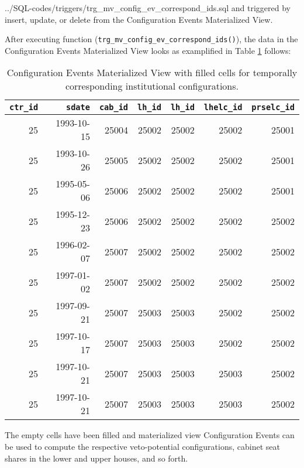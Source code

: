 %
{../SQL-codes/triggers/trg_mv_config_ev_correspond_ids.sql}
and triggered by insert, update, or delete from the Configuration Events Materialized View.%

After executing function (\texttt{trg\_mv\_config\_ev\_correspond\_ids()}), the data in the Configuration Events Materialized View looks as examplified in Table \ref{tab_mview_config_events_filled_cells} follows:

\begin{table}[h!]
\centering\footnotesize
\caption{Configuration Events Materialized View with filled cells for temporally corresponding institutional configurations.}
\label{tab_mview_config_events_filled_cells}
\begin{tabular}{r r r r r r r}
\tabularnewline\toprule\toprule
\multicolumn{1}{r}{\texttt{ctr\_id}}	&
\multicolumn{1}{r}{\texttt{sdate}}	&	
\multicolumn{1}{r}{\texttt{cab\_id}}	&
\multicolumn{1}{r}{\texttt{lh\_id}}	&
\multicolumn{1}{r}{\texttt{lh\_id}}	&	
\multicolumn{1}{r}{\texttt{lhelc\_id}}	&	
\multicolumn{1}{r}{\texttt{prselc\_id}}	\\\midrule
25	&	1993-10-15	&	25004	&	25002	&	25002	&	25002	&	25001	\\
25	&	1993-10-26	&	25005	&	25002	&	25002	&	25002	&	25001	\\
25	&	1995-05-06	&	25006	&	25002	&	25002	&	25002	&	25001	\\
25	&	1995-12-23	&	25006	&	25002	&	25002	&	25002	&	25002	\\
25	&	1996-02-07	&	25007	&	25002	&	25002	&	25002	&	25002	\\
25	&	1997-01-02	&	25007	&	25002	&	25002	&	25002	&	25002	\\
25	&	1997-09-21	&	25007	&	25003	&	25003	&	25002	&	25002	\\
25	&	1997-10-17	&	25007	&	25003	&	25003	&	25002	&	25002	\\
25	&	1997-10-21	&	25007	&	25003	&	25003	&	25003	&	25002	\\
25	&	1997-10-21	&	25007	&	25003	&	25003	&	25003	&	25002	\\\bottomrule\bottomrule
\end{tabular}
\end{table}

The empty cells have been filled and materialized view Configuration Events can be used to compute the respective veto-potential configurations, cabinet seat shares in the lower and upper houses, and so forth.
